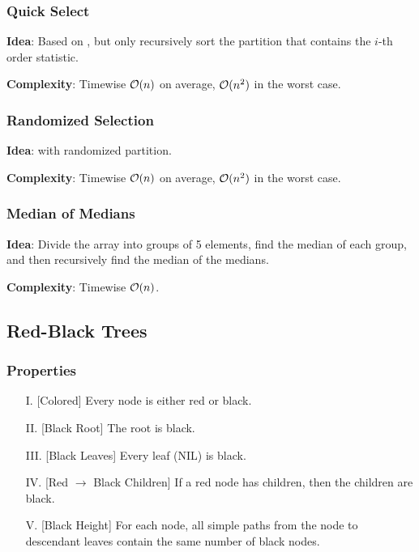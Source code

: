 \documentclass{article}
\begin{document}
\subsubsection{Quick Select}
\textbf{Idea}: Based on , but only recursively sort the partition that contains the $i$-th order statistic.\par
\textbf{Complexity}: Timewise $\mathcal{O}(n)$ on average, $\mathcal{O}(n^2)$ in the worst case.\par


\subsubsection{Randomized Selection}
\textbf{Idea}:  with randomized partition.\par
\textbf{Complexity}: Timewise $\mathcal{O}(n)$ on average, $\mathcal{O}(n^2)$ in the worst case.\par

\subsubsection{Median of Medians}
\textbf{Idea}: Divide the array into groups of 5 elements, find the median of each group, and then recursively find the median of the medians.\par
\textbf{Complexity}: Timewise $\mathcal{O}(n)$.\par

\subsection{Red-Black Trees}
\subsubsection{Properties}
\begin{itemize}
  \item[I.]\label{properties:1} [Colored] Every node is either red or black.
  \item[II.]\label{properties:2} [Black Root] The root is black.
  \item[III.]\label{properties:3} [Black Leaves] Every leaf (NIL) is black.
  \item[IV.]\label{properties:4} [Red $\to$ Black Children] If a red node has children, then the children are black.
  \item[V.]\label{properties:5} [Black Height] For each node, all simple paths from the node to descendant leaves contain the same number of black nodes.
\end{itemize}
\end{document}
